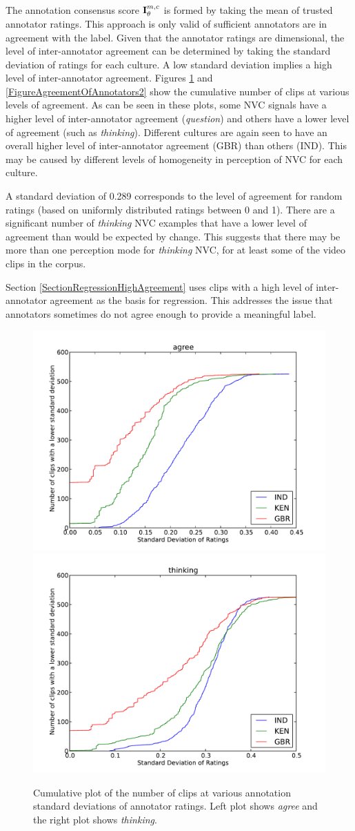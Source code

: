 The annotation consensus score $\textbf{I}^{m, c}_{\theta}$ is formed by taking the mean of trusted annotator ratings. This approach is only valid of sufficient annotators are in agreement with the label. Given that the annotator ratings are dimensional, the level of inter-annotator agreement can be determined by taking the standard deviation of ratings for each culture. A low standard deviation implies a high level of inter-annotator agreement. Figures \ref{FigureAgreementOfAnnotators1} and \ref{FigureAgreementOfAnnotators2} show the cumulative number of clips at various levels of agreement. As can be seen in these plots, some \ac{NVC} signals have a higher level of inter-annotator agreement (\textit{question}) and others have a lower level of agreement (such as \textit{thinking}). Different cultures are again seen to have an overall higher level of inter-annotator agreement (GBR) than others (IND). This may be caused by different levels of homogeneity in perception of \ac{NVC} for each culture.

A standard deviation of 0.289 corresponds to the level of agreement for random ratings (based on uniformly distributed ratings between 0 and 1). There are a significant number of \textit{thinking} \ac{NVC} examples that have a lower level of agreement than would be expected by change. This suggests that there may be more than one perception mode for \textit{thinking} \ac{NVC}, for at least some of the video clips in the corpus.

Section \ref{SectionRegressionHighAgreement} uses clips with a high level of inter-annotator agreement as the basis for regression. This addresses the issue that annotators sometimes do not agree enough to provide a meaningful label.

\begin{figure}
\centering
\includegraphics[width = 0.45 \columnwidth]{annotation/annotagree.pdf}
\includegraphics[width = 0.45 \columnwidth]{annotation/annotthinking.pdf}
\caption[Cumulative plot of the number of clips at various annotation standard deviations of annotator ratings.]{Cumulative plot of the number of clips at various annotation standard deviations of annotator ratings. Left plot shows \textit{agree} and the right plot shows \textit{thinking}.}
\label{FigureAgreementOfAnnotators1}
\end{figure}

